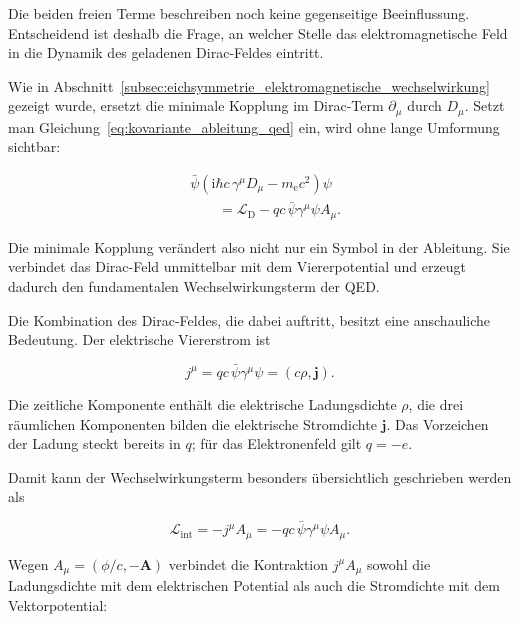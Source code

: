 Die beiden freien Terme beschreiben noch keine gegenseitige
Beeinflussung. Entscheidend ist deshalb die Frage, an welcher Stelle
das elektromagnetische Feld in die Dynamik des geladenen Dirac-Feldes
eintritt.

Wie in Abschnitt~\ref{subsec:eichsymmetrie_elektromagnetische_wechselwirkung}
gezeigt wurde, ersetzt die minimale Kopplung im Dirac-Term
\(\partial_\mu\) durch \(D_\mu\). Setzt man
Gleichung~\eqref{eq:kovariante_ableitung_qed} ein, wird ohne lange
Umformung sichtbar:

\begin{equation}
	\begin{aligned}
	&\bar{\psi}
	\left(
	\mathrm{i}\hbar c\,\gamma^\mu D_\mu
	-
	m_{\mathrm e}c^2
	\right)
	\psi
	\\[4pt]
	&\qquad=
	\mathcal L_{\mathrm D}
	-
	qc\,\bar{\psi}\gamma^\mu\psi A_\mu.
	\end{aligned}
	\label{eq:minimale_kopplung_lagrangedichte_qed}
\end{equation}

Die minimale Kopplung verändert also nicht nur ein Symbol in der
Ableitung. Sie verbindet das Dirac-Feld unmittelbar mit dem
Viererpotential und erzeugt dadurch den fundamentalen
Wechselwirkungsterm der QED.

Die Kombination des Dirac-Feldes, die dabei auftritt, besitzt eine
anschauliche Bedeutung. Der elektrische
Viererstrom ist

\begin{equation}
	j^\mu
	=
	qc\,\bar{\psi}\gamma^\mu\psi
	=
	\left(c\rho,\mathbf j\right).
	\label{eq:viererstrom_diracfeld_qed}
\end{equation}

Die zeitliche Komponente enthält die elektrische Ladungsdichte
\(\rho\), die drei räumlichen Komponenten bilden die elektrische
Stromdichte \(\mathbf j\). Das Vorzeichen der Ladung steckt bereits in
\(q\); für das Elektronenfeld gilt \(q=-e\).

Damit kann der Wechselwirkungsterm besonders übersichtlich geschrieben
werden als

\begin{equation}
	\mathcal L_{\mathrm{int}}
	=
	-j^\mu A_\mu
	=
	-qc\,\bar{\psi}\gamma^\mu\psi A_\mu.
	\label{eq:wechselwirkungsterm_qed}
\end{equation}

Wegen \(A_\mu=(\phi/c,-\mathbf A)\) verbindet die Kontraktion
\(j^\mu A_\mu\) sowohl die Ladungsdichte mit dem elektrischen Potential
als auch die Stromdichte mit dem Vektorpotential:


